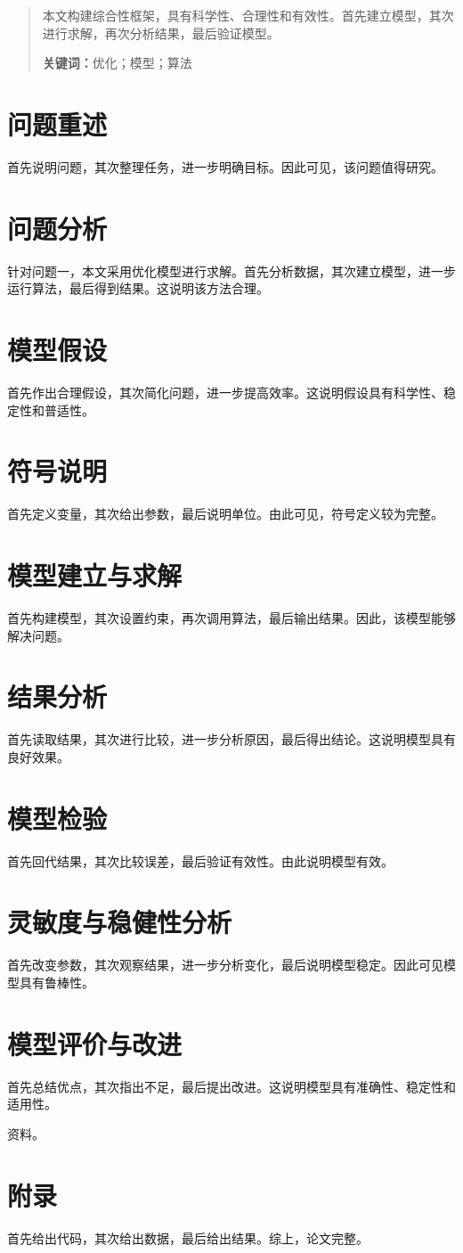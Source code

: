 \documentclass{ctexart}
\newcommand{\keywords}[1]{\par\textbf{关键词：}#1}
\begin{document}
\begin{abstract}
本文构建综合性框架，具有科学性、合理性和有效性。首先建立模型，其次进行求解，再次分析结果，最后验证模型。
\keywords{优化；模型；算法}
\end{abstract}
\section{问题重述}
首先说明问题，其次整理任务，进一步明确目标。因此可见，该问题值得研究。
\section{问题分析}
针对问题一，本文采用优化模型进行求解。首先分析数据，其次建立模型，进一步运行算法，最后得到结果。这说明该方法合理。
\section{模型假设}
首先作出合理假设，其次简化问题，进一步提高效率。这说明假设具有科学性、稳定性和普适性。
\section{符号说明}
首先定义变量，其次给出参数，最后说明单位。由此可见，符号定义较为完整。
\section{模型建立与求解}
首先构建模型，其次设置约束，再次调用算法，最后输出结果。因此，该模型能够解决问题。
\section{结果分析}
首先读取结果，其次进行比较，进一步分析原因，最后得出结论。这说明模型具有良好效果。
\section{模型检验}
首先回代结果，其次比较误差，最后验证有效性。由此说明模型有效。
\section{灵敏度与稳健性分析}
首先改变参数，其次观察结果，进一步分析变化，最后说明模型稳定。因此可见模型具有鲁棒性。
\section{模型评价与改进}
首先总结优点，其次指出不足，最后提出改进。这说明模型具有准确性、稳定性和适用性。
\begin{thebibliography}{9} 资料。\end{thebibliography}
\appendix
\section{附录}
首先给出代码，其次给出数据，最后给出结果。综上，论文完整。
\end{document}
